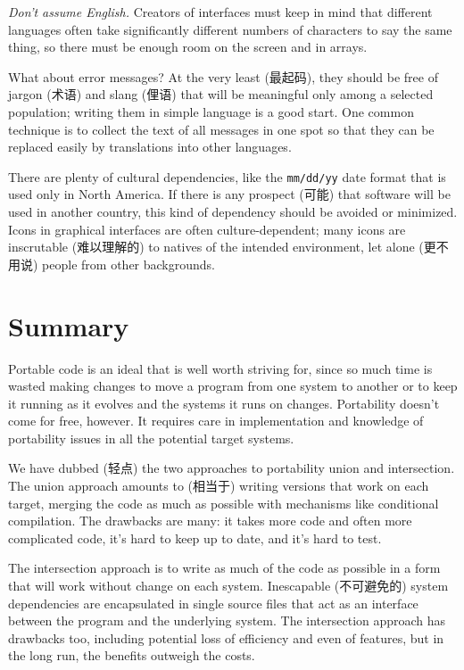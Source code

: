 \emph{Don't assume English.} Creators of interfaces must keep in mind that
different languages often take significantly different numbers of
characters to say the same thing, so there must be enough room on the
screen and in arrays.

What about error messages? At the very least (最起码), they should be free
of jargon (术语) and slang (俚语) that will be meaningful only among a
selected population; writing them in simple language is a good start. One
common technique is to collect the text of all messages in one spot so that
they can be replaced easily by translations into other languages.

There are plenty of cultural dependencies, like the \verb'mm/dd/yy' date
format that is used only in North America. If there is any prospect (可能)
that software will be used in another country, this kind of dependency
should be avoided or minimized.  Icons in graphical interfaces are often
culture-dependent; many icons are inscrutable (难以理解的) to natives of
the intended environment, let alone (更不用说) people from other
backgrounds.

\section{Summary}

Portable code is an ideal that is well worth striving for, since so much
time is wasted making changes to move a program from one system to another
or to keep it running as it evolves and the systems it runs on changes.
Portability doesn't come for free, however. It requires care in
implementation and knowledge of portability issues in all the potential
target systems.

We have dubbed (轻点) the two approaches to portability union and
intersection.  The union approach amounts to (相当于) writing versions that
work on each target, merging the code as much as possible with mechanisms
like conditional compilation. The drawbacks are many: it takes more code
and often more complicated code, it's hard to keep up to date, and it's
hard to test.

The intersection approach is to write as much of the code as possible in a
form that will work without change on each system. Inescapable (不可避免的)
system dependencies are encapsulated in single source files that act as an
interface between the program and the underlying system. The intersection
approach has drawbacks too, including potential loss of efficiency and even
of features, but in the long run, the benefits outweigh the costs.

